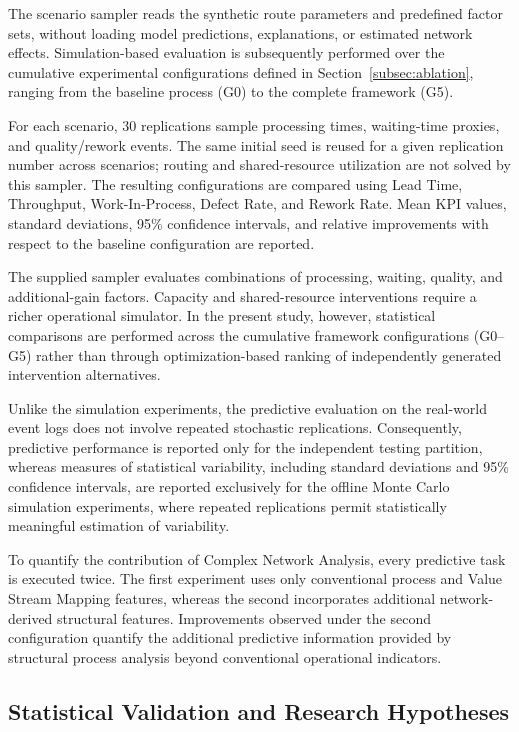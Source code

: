 \documentclass[pdflatex,iicol,Numbered,sn-basic]{sn-jnl}
\begin{document}
The scenario sampler reads the synthetic route parameters and predefined factor sets, without loading model predictions, explanations, or estimated network effects. Simulation-based evaluation is subsequently performed over the cumulative experimental configurations defined in Section~\ref{subsec:ablation}, ranging from the baseline process (G0) to the complete framework (G5).

For each scenario, 30 replications sample processing times, waiting-time proxies, and quality/rework events. The same initial seed is reused for a given replication number across scenarios; routing and shared-resource utilization are not solved by this sampler. The resulting configurations are compared using Lead Time, Throughput, Work-In-Process, Defect Rate, and Rework Rate. Mean KPI values, standard deviations, 95\% confidence intervals, and relative improvements with respect to the baseline configuration are reported.

The supplied sampler evaluates combinations of processing, waiting, quality, and additional-gain factors. Capacity and shared-resource interventions require a richer operational simulator. In the present study, however, statistical comparisons are performed across the cumulative framework configurations (G0--G5) rather than through optimization-based ranking of independently generated intervention alternatives.

Unlike the simulation experiments, the predictive evaluation on the real-world event logs does not involve repeated stochastic replications. Consequently, predictive performance is reported only for the independent testing partition, whereas measures of statistical variability, including standard deviations and 95\% confidence intervals, are reported exclusively for the offline Monte Carlo simulation experiments, where repeated replications permit statistically meaningful estimation of variability.

To quantify the contribution of Complex Network Analysis, every predictive task is executed twice. The first experiment uses only conventional process and Value Stream Mapping features, whereas the second incorporates additional network-derived structural features. Improvements observed under the second configuration quantify the additional predictive information provided by structural process analysis beyond conventional operational indicators.

\subsection{Statistical Validation and Research Hypotheses}
\label{subsec:statistical_validation}
\end{document}
